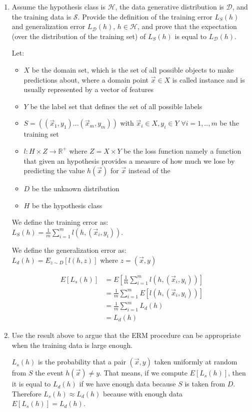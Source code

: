 \documentclass[a4paper,11pt,oneside]{book}
\begin{document}
\begin{enumerate}
\clearpage 
\item Assume the hypothesis class is $\mathcal{H}$, the data generative distribution is $\mathcal{D}$, and the training data is $\mathcal{S}$. Provide the definition of the training error $L_S(h)$ and generalization error $L_{\mathcal{D}}(h)$, $h \in \mathcal{H}$, and prove that the expectation (over the distribution of the training set) of $L_S(h)$ is equal to $L_{\mathcal{D}}(h)$.

\begin{solution}
    Let:
    \begin{itemize}
    \item $X$ be the domain set, which is the set of all possible objects to make predictions about, where a domain point $\vec{x} \in X$ is called instance and is usually represented by a vector of features
    \item $Y$ be the label set that defines the set of all possible labels
    \item $S = ((\vec{x}_1, y_1) ... (\vec{x}_m, y_m))$ with $\vec{x}_i \in X, y_i \in Y$ $\forall i = 1,..,m$ be the training set
    \item $l: H\times Z \to \mathbb{R}^+$ where $Z = X\times Y$ be the loss function namely a function that given an hypothesis provides a measure of how much we lose by predicting the value $h(\vec{x})$ for $\vec{x}$ instead of the
    \item $D$ be the unknown distribution
    \item $H$ be the hypothesis class
    \end{itemize}
    
    We define the training error as: \\ $L_S(h) = \frac{1}{m}\sum_{i=1}^m l(h, (\vec{x}_i,y_i))$.
    
    We define the generalization error as: \\ $L_d(h) = E_{z\sim D}[l(h,z)]$ where $z = (\vec{x}, y)$

    \begin{align*}
    E[L_s(h)] &= E\left[\frac{1}{m}\sum_{i=1}^m l(h, (\vec{x}_i,y_i))\right] \\
    &= \frac{1}{m}\sum_{i=1}^m E[l(h, (\vec{x}_i,y_i))] \\
    &= \frac{1}{m}\sum_{i=1}^m L_d(h) \\
    &= L_d(h)
    \end{align*}
\end{solution}

\clearpage
\item Use the result above to argue that the ERM procedure can be appropriate when the training data is large enough.
\begin{solution}
    $L_s(h)$ is the probability that a pair $(\vec{x},y)$ taken uniformly at random from $S$ the event $h(\vec{x}) \neq y$. That means, if we compute $E[L_s(h)]$, then it is equal to $L_d(h)$ if we have enough data because $S$ is taken from $D$. Therefore $L_s(h) \approx L_d(h)$ because with enough data $E[L_s(h)] = L_d(h)$.
\end{solution}
\end{enumerate}
\end{document}
